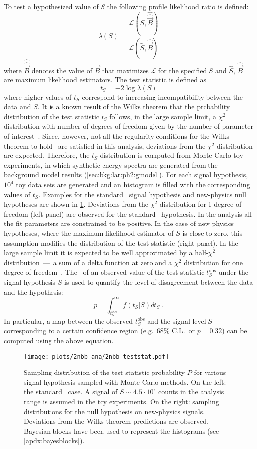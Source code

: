 To test a hypothesized value of $S$ the following profile likelihood ratio is defined:
\[
  \lambda(S) = \frac{\mathcal{L}(S, \hat{\hat{\vec{B}}})}{\mathcal{L}(\hat{S}, \hat{\vec{B}})}
\]
where $\hat{\hat{\vec{B}}}$ denotes the value of $\vec{B}$ that maximizes $\mathcal{L}$
for the specified $S$ and $\hat{S}$, $\hat{\vec{B}}$ are maximum likelihood
estimators. The test statistic is defined as
\[
  t_S = -2\log\lambda(S)
\]
where higher values of $t_S$ correspond to increasing incompatibility between the data and
$S$. It is a known result of the Wilks theorem that the probability distribution of the
test statistic $t_S$ follows, in the large sample limit, a $\chi^2$ distribution with
number of degrees of freedom given by the number of parameter of
interest~\cite{Cowan2011}.  Since, however, not all the regularity conditions for the
Wilks theorem to hold~\cite{Algeri2020} are satisfied in this analysis, deviations from
the $\chi^2$ distribution are expected. Therefore, the $t_S$ distribution is computed from
Monte Carlo toy experiments, in which synthetic energy spectra are generated from the
background model results (\cref{sec:bkg:lar:ph2:gmodel}). For each signal hypothesis,
$10^4$ toy data sets are generated and an histogram is filled with the corresponding
values of $t_S$. Examples for the standard \nnbb\ signal hypothesis and new-physics
null hypotheses are shown in \cref{fig:2nbb-ana:ts-dist}. Deviations from the $\chi^2$
distribution for 1 degree of freedom (left panel) are observed for the standard \nnbb\
hypothesis. In the analysis all the fit parameters are constrained to be positive. In the
case of new physics hypotheses, where the maximum likelihood estimator of $S$ is close to
zero, this assumption modifies the distribution of the test statistic (right panel). In
the large sample limit it is expected to be well approximated by a half-$\chi^2$
distribution~---~a sum of a delta function at zero and a $\chi^2$ distribution for one
degree of freedom~\cite{Chernoff1954}.
\newpar
The \pvalue\ of an observed value of the test statistic $t_S^\text{obs}$ under the signal
hypothesis $S$ is used to quantify the level of disagreement between the data and the
hypothesis:
\[
  p = \int_{t_S^\text{obs}}^\infty f(t_S | S) dt_S \;.
\]
In particular, a map between the observed $t_S^\text{obs}$ and the signal level $S$
corresponding to a certain confidence region (e.g.~68\% C.L.~or $p=0.32$) can be computed
using the above equation.

\begin{figure}
  \centering
  \texttt{[image: plots/2nbb-ana/2nbb-teststat.pdf]}
  \caption{%
    Sampling distribution of the test statistic probability $P$ for various signal
    hypothesis sampled with Monte Carlo methods. On the left: the standard \nnbb\ case. A
    signal of $S \sim 4.5 \cdot 10^5$ counts in the analysis range is assumed in the toy
    experiments. On the right: sampling distributions for the null hypothesis on
    new-physics signals.  Deviations from the Wilks theorem predictions are observed.
    Bayesian blocks have been used to represent the histograms (see
    \cref{apdx:bayesblocks}).
  }\label{fig:2nbb-ana:ts-dist}
\end{figure}

